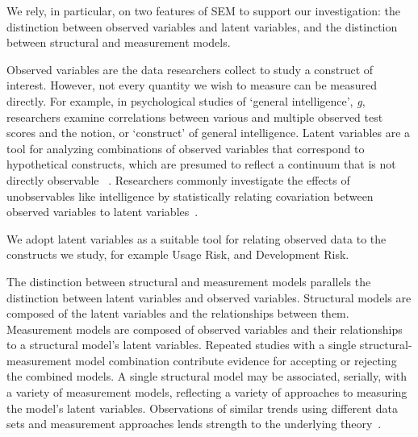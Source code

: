 We rely, in particular, on two features of SEM to support our investigation: the distinction between observed variables and latent variables, and the distinction between structural and measurement models. 

Observed variables are the data researchers collect to study a construct of interest. However, not every quantity we wish to measure can be measured directly. For example, in psychological studies of `general intelligence', \textit{g}, researchers examine correlations between various and multiple observed test scores and the notion, or `construct' of general intelligence. Latent variables are a tool for analyzing combinations of observed variables that correspond to hypothetical constructs, which are presumed to reflect a continuum that is not directly observable ~\cite{kline2015principles}. Researchers commonly investigate the effects of unobservables like intelligence by statistically relating covariation between observed variables to latent variables~\cite{borsboom2003theoretical}.  

We adopt latent variables as a suitable tool for relating observed data to the constructs we study, for example Usage Risk, and Development Risk.

The distinction between structural and measurement models parallels the distinction between latent variables and observed variables. Structural models are composed of the latent variables and the relationships between them. Measurement models are composed of observed variables and their relationships to a structural model's latent variables. Repeated studies with a single structural-measurement model combination contribute evidence for accepting or rejecting the combined models. A single structural model may be associated, serially, with a variety of measurement models, reflecting a variety of approaches to measuring the model's latent variables.  Observations of similar trends using different data sets and measurement approaches lends strength to the underlying theory~\cite{basili1999building,wohlin2000experimentation}. 

